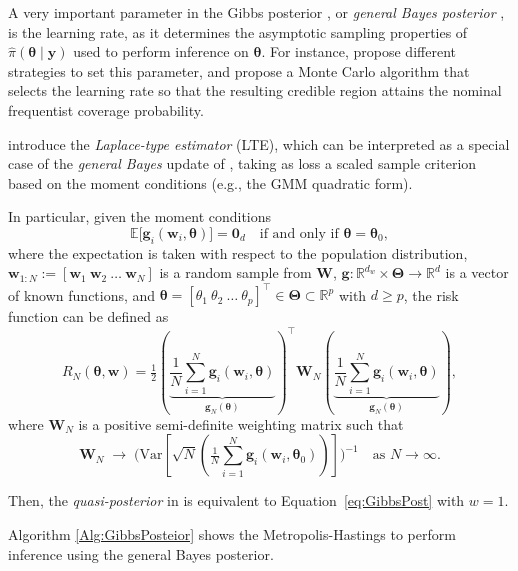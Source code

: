 A very important parameter in the Gibbs posterior \cite{Jiang2008}, or \textit{general Bayes posterior} \cite{bissiri2016general}, is the learning rate, as it determines the asymptotic sampling properties of $\hat{\pi}(\boldsymbol{\theta}\mid\mathbf{y})$ used to perform inference on $\boldsymbol{\theta}$. For instance, \cite{bissiri2016general} propose different strategies to set this parameter, and \cite{Syring2019} propose a Monte Carlo algorithm that selects the learning rate so that the resulting credible region attains the nominal frequentist coverage probability.

\cite{chernozhukov2003mcmc} introduce the \emph{Laplace-type estimator} (LTE), which can be interpreted as a special case of the \emph{general Bayes} update of \cite{bissiri2016general}, taking as loss a scaled sample criterion based on the moment conditions (e.g., the GMM quadratic form).

In particular, given the moment conditions
\[
\mathbb{E}\!\big[\mathbf{g}_i(\mathbf{w}_i,\boldsymbol{\theta})\big]=\mathbf{0}_{d} 
\quad \text{if and only if } \boldsymbol{\theta}=\boldsymbol{\theta}_0,
\]
where the expectation is taken with respect to the population distribution, 
$\mathbf{w}_{1:N}:=[\mathbf{w}_1 \ \mathbf{w}_2 \ \dots \ \mathbf{w}_N]$ is a random sample from $\mathbf{W}$, 
$\mathbf{g}:\mathbb{R}^{d_w}\times\boldsymbol{\Theta}\to\mathbb{R}^{d}$ is a vector of known functions, and 
$\boldsymbol{\theta}=[\theta_{1}\ \theta_{2}\ \dots\ \theta_{p}]^{\top}\in\boldsymbol{\Theta}\subset\mathbb{R}^{p}$ with $d\geq p$, the risk function can be defined as
\[
R_N(\boldsymbol{\theta},\mathbf{w})=\tfrac{1}{2}\left(\underbrace{\frac{1}{N}\sum_{i=1}^N \mathbf{g}_i(\mathbf{w}_i,\boldsymbol{\theta})}_{\mathbf{g}_N(\boldsymbol{\theta})}\right)^{\top}\mathbf{W}_N\left(\underbrace{\frac{1}{N}\sum_{i=1}^N\mathbf{g}_i(\mathbf{w}_i,\boldsymbol{\theta})}_{\mathbf{g}_N(\boldsymbol{\theta})}\right),
\]
where $\mathbf{W}_N$ is a positive semi-definite weighting matrix such that
\[
\mathbf{W}_N \;\to\; 
\Bigg(\text{Var}\left[\sqrt{N}\left(\tfrac{1}{N}\sum_{i=1}^N \mathbf{g}_i(\mathbf{w}_i,\boldsymbol{\theta}_0)\right)\right]\Bigg)^{-1}
\quad \text{as } N\rightarrow \infty.
\]  

Then, the \textit{quasi-posterior} in \cite{chernozhukov2003mcmc} is equivalent to Equation~\ref{eq:GibbsPost} with $w=1$.

Algorithm \ref{Alg:GibbsPosteior} shows the Metropolis-Hastings to perform inference using the general Bayes posterior.


